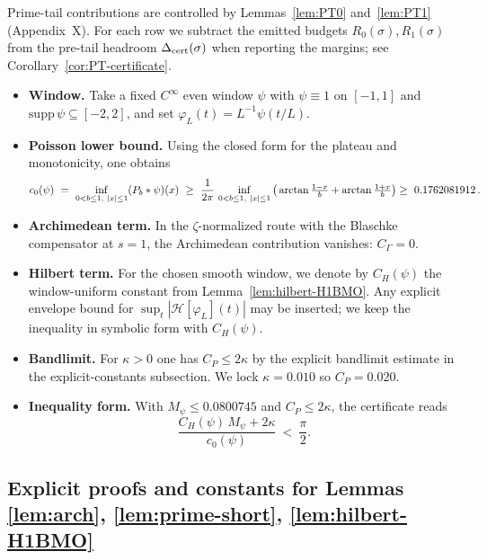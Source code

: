 \documentclass[11pt]{article}
\providecommand{\Mpsilocked}{0.0800745}%
\theoremstyle{definition}
\theoremstyle{remark}
\newcommand{\Poisson}{P}
\begin{document}
% 
% 
% 
% 
% 
\noindent Prime-tail contributions are controlled by Lemmas~\ref{lem:PT0} and~\ref{lem:PT1} (Appendix~X). For each row we subtract the emitted budgets $R_{0}(\sigma),R_{1}(\sigma)$ from the pre-tail headroom $\Delta_{\rm cert}(\sigma)$ when reporting the margins; see Corollary~\ref{cor:PT-certificate}.
\begin{itemize}
  \item \textbf{Window.} Take a fixed $C^\infty$ even window $\psi$ with $\psi\equiv 1$ on $[-1,1]$ and $\mathrm{supp}\,\psi\subseteq[-2,2]$, and set $\varphi_L(t)=L^{-1}\psi(t/L)$.
  \item \textbf{Poisson lower bound.} Using the closed form for the plateau and monotonicity, one obtains
  \[
    c_0(\psi)\ =\ \inf_{0<b\le 1,\ |x|\le 1} (\Poisson_b*\psi)(x)\ \ge\ \frac{1}{2\pi}\,\inf_{0<b\le 1,\ |x|\le 1}\big(\arctan\tfrac{1-x}{b}+\arctan\tfrac{1+x}{b}\big)
    \\ \ge\ 0.1762081912\,.
  \]
  \item \textbf{Archimedean term.} In the \(\zeta\)-normalized route with the Blaschke compensator at \(s=1\), the Archimedean contribution vanishes: \(C_\Gamma=0\).
  \item \textbf{Hilbert term.} For the chosen smooth window, we denote by $C_H(\psi)$ the window-uniform constant from Lemma~\ref{lem:hilbert-H1BMO}. Any explicit envelope bound for $\sup_t |\mathcal H[\varphi_L](t)|$ may be inserted; we keep the inequality in symbolic form with $C_H(\psi)$.
  \item \textbf{Bandlimit.} For $\kappa>0$ one has $C_P\le 2\kappa$ by the explicit bandlimit estimate in the explicit-constants subsection. We lock $\kappa=0.010$ so $C_P=0.020$.
  \item \textbf{Inequality form.} With $M_\psi\le \Mpsilocked$ and $C_P\le 2\kappa$, the certificate reads
  \[
    \frac{C_H(\psi)\,M_\psi + 2\kappa}{c_0(\psi)}\ <\ \frac{\pi}{2}.
  \]
\end{itemize}

\subsection*{Explicit proofs and constants for Lemmas \ref{lem:arch}, \ref{lem:prime-short}, \ref{lem:hilbert-H1BMO}}
\end{document}
